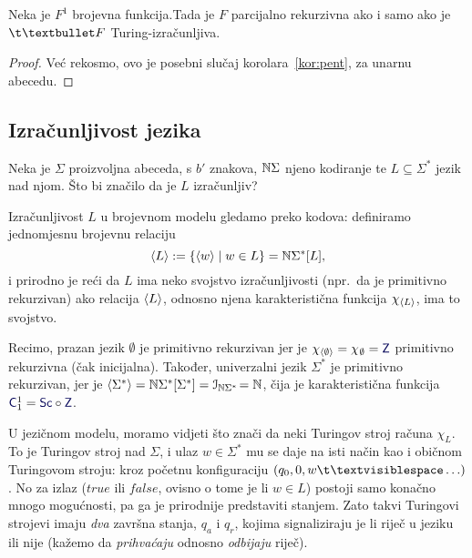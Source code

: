 \begin{korolar}[{name=[unarno reprezentirane brojevne funkcije u različitim modelima]}]\label{kor:peuf}
Neka je $F^1$ brojevna funkcija.\newline Tada je $F$ parcijalno rekurzivna ako i samo ako je $\t\textbullet F$ Turing-izračunljiva.
\end{korolar}
\begin{proof}
Već rekosmo, ovo je posebni slučaj korolara~\ref{kor:pent}, za unarnu abecedu.
\end{proof}

\subsection{Izračunljivost jezika}\label{sec:Todl}

Neka je $\Sigma$ proizvoljna abeceda, s $b'$ znakova, ${\mathbb N}\Sigma$ njeno kodiranje te $L\subseteq\Sigma^*$ jezik nad njom. Što bi značilo da je $L$ izračunljiv?

Izračunljivost $L$ u brojevnom modelu gledamo preko kodova: definiramo jednomjesnu brojevnu relaciju
\begin{equation}\label{eq:kodLdef}
    \langle L\rangle:=\{\langle w\rangle\mid w\in L\}={\mathbb N}\Sigma^*[L]\text,
\end{equation}
i prirodno je reći da $L$ ima neko svojstvo izračunljivosti (npr.\ da je primitivno rekurzivan) ako relacija $\langle L\rangle$, odnosno njena karakteristična funkcija $\chi_{\langle L\rangle}$, ima to svojstvo.

Recimo, prazan jezik $\emptyset$ je primitivno rekurzivan jer je $\chi_{\kr\emptyset}=\chi_{\mspace{1mu}\emptyset}=\f Z$ primitivno rekurzivna (čak inicijalna). Također, univerzalni jezik $\Sigma^*$ je primitivno rekurzivan, jer je $\langle\Sigma^*\rangle={\mathbb N}\Sigma^*[\Sigma^*]=\mathcal I_{{\mathbb N}\Sigma^*}\!={\mathbb N}$, čija je karakteristična funkcija $\f C_1^1=\f{Sc}\circ\f Z$.

U jezičnom modelu, moramo vidjeti što znači da neki Turingov stroj računa $\chi_L$. To je Turingov stroj nad $\Sigma$, i ulaz $w\in\Sigma^*$ mu se daje na isti način kao i običnom Turingovom stroju: kroz početnu konfiguraciju $(q_0,0,w\bl\ldots)$. No za izlaz ($\mathit{true}$ ili $\mathit{false}$, ovisno o tome je li $w\in L$) postoji samo konačno mnogo mogućnosti, pa ga je prirodnije predstaviti stanjem. Zato takvi Turingovi strojevi imaju \emph{dva} završna stanja, $q_a$ i $q_r$, kojima signaliziraju je li riječ u jeziku ili nije (kažemo da \emph{prihvaćaju} odnosno \emph{odbijaju} riječ).

